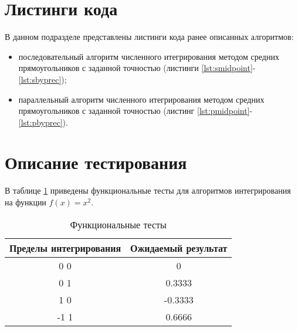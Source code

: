 \section{Листинги кода}

В данном подразделе представлены листинги кода ранее описанных алгоритмов:
\begin{itemize}[left=\parindent]
    \item последовательный алгоритм численного итегрирования методом средних
        прямоугольников с заданной точностью (листинги
        \ref{lst:smidpoint}-\ref{lst:sbyprec});
    \item параллельный алгоритм численного итегрирования методом средних
        прямоугольников с заданной точностью (листинг
        \ref{lst:pmidpoint}-\ref{lst:pbyprec}).
\end{itemize}

%
%
%
%

\section{Описание тестирования}

В таблице \ref{tab:tests} приведены функциональные тесты для алгоритмов
интегрирования на функции $f(x) = x^2$.

\begin{table}[h!]
	\begin{center}
    \begin{threeparttable}
        \captionsetup{justification=raggedright,singlelinecheck=off}
        \caption{\label{tab:tests}Функциональные тесты}
        \begin{tabular}{|c|c|}
			\hline
            \textbf{Пределы интегрирования} & \textbf{Ожидаемый результат} \\ [2mm]
            \hline
            0 0
            &
            0
            \\
            \hline
            0 1
            &
            0.3333
            \\
            \hline
            1 0
            &
            -0.3333
            \\
            \hline
            -1 1
            &
            0.6666
            \\
            \hline
		\end{tabular}
    \end{threeparttable} 
	\end{center}
\end{table}

